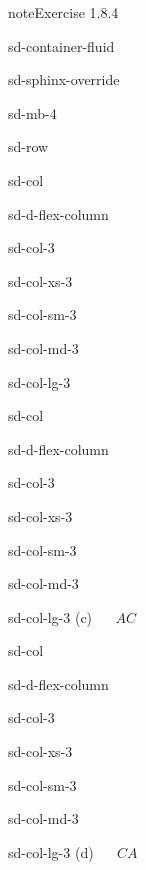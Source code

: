\documentclass[letterpaper,10pt,english]{jupyterBook}
\begin{document}
\begin{sphinxadmonition}{note}{Exercise 1.8.4}
\begin{sphinxuseclass}{sd-container-fluid}
\begin{sphinxuseclass}{sd-sphinx-override}
\begin{sphinxuseclass}{sd-mb-4}
\begin{sphinxuseclass}{sd-row}
\begin{sphinxuseclass}{sd-col}
\begin{sphinxuseclass}{sd-d-flex-column}
\begin{sphinxuseclass}{sd-col-3}
\begin{sphinxuseclass}{sd-col-xs-3}
\begin{sphinxuseclass}{sd-col-sm-3}
\begin{sphinxuseclass}{sd-col-md-3}
\begin{sphinxuseclass}{sd-col-lg-3}
\end{sphinxuseclass}
\end{sphinxuseclass}
\end{sphinxuseclass}
\end{sphinxuseclass}
\end{sphinxuseclass}
\end{sphinxuseclass}
\end{sphinxuseclass}
\begin{sphinxuseclass}{sd-col}
\begin{sphinxuseclass}{sd-d-flex-column}
\begin{sphinxuseclass}{sd-col-3}
\begin{sphinxuseclass}{sd-col-xs-3}
\begin{sphinxuseclass}{sd-col-sm-3}
\begin{sphinxuseclass}{sd-col-md-3}
\begin{sphinxuseclass}{sd-col-lg-3}
\sphinxAtStartPar
(c)    \(AC\)

\end{sphinxuseclass}
\end{sphinxuseclass}
\end{sphinxuseclass}
\end{sphinxuseclass}
\end{sphinxuseclass}
\end{sphinxuseclass}
\end{sphinxuseclass}
\begin{sphinxuseclass}{sd-col}
\begin{sphinxuseclass}{sd-d-flex-column}
\begin{sphinxuseclass}{sd-col-3}
\begin{sphinxuseclass}{sd-col-xs-3}
\begin{sphinxuseclass}{sd-col-sm-3}
\begin{sphinxuseclass}{sd-col-md-3}
\begin{sphinxuseclass}{sd-col-lg-3}
\sphinxAtStartPar
(d)    \(CA\)


\end{sphinxuseclass}
\end{sphinxuseclass}
\end{sphinxuseclass}
\end{sphinxuseclass}
\end{sphinxuseclass}
\end{sphinxuseclass}
\end{sphinxuseclass}
\end{sphinxuseclass}
\end{sphinxuseclass}
\end{sphinxuseclass}
\end{sphinxuseclass}
\end{sphinxadmonition}
\end{document}
